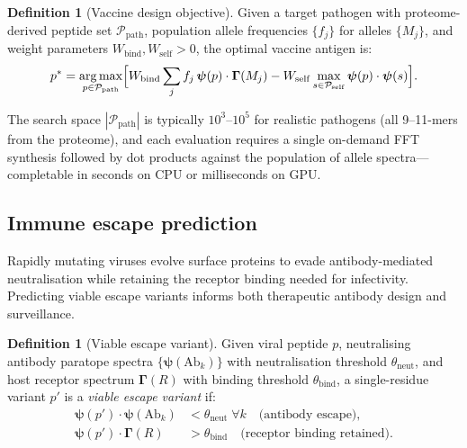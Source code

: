 \documentclass[twocolumn,11pt,a4paper]{article}
\theoremstyle{definition}
\newtheorem{definition}[theorem]{Definition}
\theoremstyle{remark}
\DeclareMathOperator*{\argmax}{arg\,max}
\begin{document}
\begin{definition}[Vaccine design objective]
\label{def:vaccine}
Given a target pathogen with proteome-derived peptide set
$\mathcal{P}_{\mathrm{path}}$, population allele frequencies $\{f_j\}$ for
alleles $\{M_j\}$, and weight parameters $W_{\mathrm{bind}},
W_{\mathrm{self}} > 0$, the optimal vaccine antigen is:
\begin{equation}
  p^* = \argmax_{p \in \mathcal{P}_{\mathrm{path}}}
  \Bigl[W_{\mathrm{bind}}\sum_j f_j\,\bm{\psi}(p)\cdot\bm{\Gamma}(M_j)
        - W_{\mathrm{self}}\max_{s \in \mathcal{P}_{\mathrm{self}}}
          \bm{\psi}(p)\cdot\bm{\psi}(s)\Bigr].
  \label{eq:vaccine_objective}
\end{equation}
\end{definition}

The search space $|\mathcal{P}_{\mathrm{path}}|$ is typically $10^3$--$10^5$
for realistic pathogens (all 9--11-mers from the proteome), and each
evaluation requires a single on-demand FFT synthesis followed by dot products
against the population of allele spectra---completable in seconds on CPU or
milliseconds on GPU.

\subsection{Immune escape prediction}
\label{sec:escape}

Rapidly mutating viruses evolve surface proteins to evade antibody-mediated
neutralisation while retaining the receptor binding needed for infectivity.
Predicting viable escape variants informs both therapeutic antibody design and
surveillance.

\begin{definition}[Viable escape variant]
\label{def:escape}
Given viral peptide $p$, neutralising antibody paratope spectra
$\{\bm{\psi}(\mathrm{Ab}_k)\}$ with neutralisation threshold
$\theta_{\mathrm{neut}}$, and host receptor spectrum $\bm{\Gamma}(R)$ with
binding threshold $\theta_{\mathrm{bind}}$, a single-residue variant $p'$
is a \emph{viable escape variant} if:
\begin{align}
  \bm{\psi}(p')\cdot\bm{\psi}(\mathrm{Ab}_k)
    &< \theta_{\mathrm{neut}} \;\forall k
    \quad\text{(antibody escape)},
    \label{eq:escape_ab}\\
  \bm{\psi}(p')\cdot\bm{\Gamma}(R)
    &> \theta_{\mathrm{bind}}
    \quad\text{(receptor binding retained)}.
    \label{eq:escape_bind}
\end{align}
\end{definition}
\end{document}
